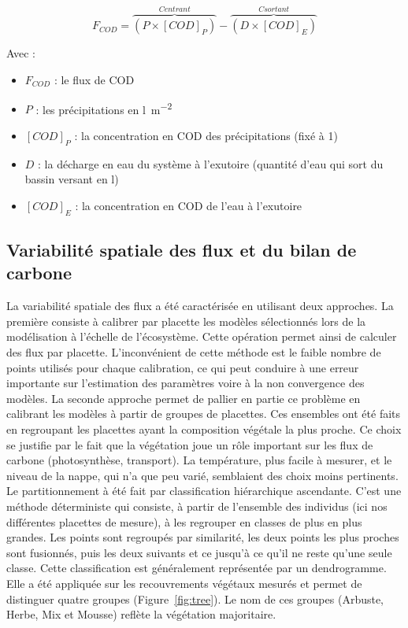 \begin{equation}
\label{eq:COD}
F_{COD} = \overbrace{(P\times[COD]_{P})}^{C entrant}-\overbrace{(D\times[COD]_{E})}^{C sortant}
\end{equation}

Avec :
\begin{itemize}
\item $F_{COD}$ : le flux de COD
\item $P$ : les précipitations en \si{\litre\per\square\metre}
\item $[COD]_{P}$ : la concentration en COD des précipitations (fixé à \SI{1}{\mgl})
\item $D$ : la décharge en eau du système à l'exutoire (quantité d'eau qui sort du bassin versant en \si{\litre})
\item $[COD]_{E}$ : la concentration en COD de l'eau à l'exutoire 
\end{itemize}

\subsection{Variabilité spatiale des flux et du bilan de carbone}

La variabilité spatiale des flux a été caractérisée en utilisant deux approches.
La première consiste à calibrer par placette les modèles sélectionnés lors de la modélisation à l'échelle de l'écosystème.
Cette opération permet ainsi de calculer des flux par placette.
L'inconvénient de cette méthode est le faible nombre de points utilisés pour chaque calibration, ce qui peut conduire à une erreur importante sur l'estimation des paramètres voire à la non convergence des modèles.
La seconde approche permet de pallier en partie ce problème en calibrant les modèles à partir de groupes de placettes.
Ces ensembles ont été faits en regroupant les placettes ayant la composition végétale la plus proche.
Ce choix se justifie par le fait que la végétation joue un rôle important sur les flux de carbone (photosynthèse, transport).
La température, plus facile à mesurer, et le niveau de la nappe, qui n'a que peu varié, semblaient des choix moins pertinents. 
Le partitionnement à été fait par classification hiérarchique ascendante.
C'est une méthode déterministe qui consiste, à partir de l'ensemble des individus (ici nos différentes placettes de mesure), à les regrouper en classes de plus en plus grandes.
Les points sont regroupés par similarité, les deux points les plus proches sont fusionnés, puis les deux suivants et ce jusqu'à ce qu'il ne reste qu'une seule classe.
Cette classification est généralement représentée par un dendrogramme.
Elle a été appliquée sur les recouvrements végétaux mesurés et permet de distinguer quatre groupes (Figure~\ref{fig:tree}).
Le nom de ces groupes (Arbuste, Herbe, Mix et Mousse) reflète la végétation majoritaire.

